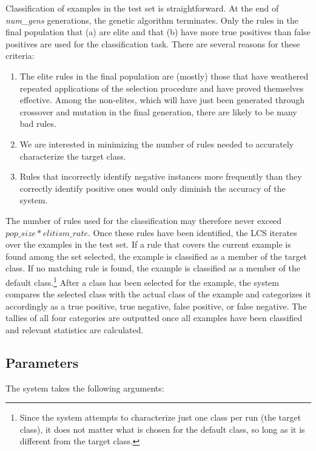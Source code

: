 \documentclass[12pt,twoside]{article}
\begin{document}
Classification of examples in the test set is straightforward. At the end of \textit{num\_gens} generations, the genetic algorithm terminates. Only the rules in the final population that (a) are elite and that (b) have more true positives than false positives are used for the classification task. There are several reasons for these criteria:
\begin{enumerate}
\item The elite rules in the final population are (mostly) those that have weathered repeated applications of the selection procedure and have proved themselves effective. Among the non-elites, which will have just been generated through crossover and mutation in the final generation, there are likely to be many bad rules.
\item We are interested in minimizing the number of rules needed to accurately characterize the target class.
\item Rules that incorrectly identify negative instances more frequently than they correctly identify positive ones would only diminish the accuracy of the system.
\end{enumerate}

The number of rules used for the classification may therefore never exceed $pop\_size * elitism\_rate$. Once these rules have been identified, the LCS iterates over the examples in the test set. If a rule that covers the current example is found among the set selected, the example is classified as a member of the target class. If no matching rule is found, the example is classified as a member of the default class.\footnote{Since the system attempts to characterize just one class per run (the target class), it does not matter what is chosen for the default class, so long as it is different from the target class.} After a class has been selected for the example, the system compares the selected class with the actual class of the example and categorizes it accordingly as a true positive, true negative, false positive, or false negative. The tallies of all four categories are outputted once all examples have been classified and relevant statistics are calculated.

\subsection{Parameters}

The system takes the following arguments:
\end{document}
